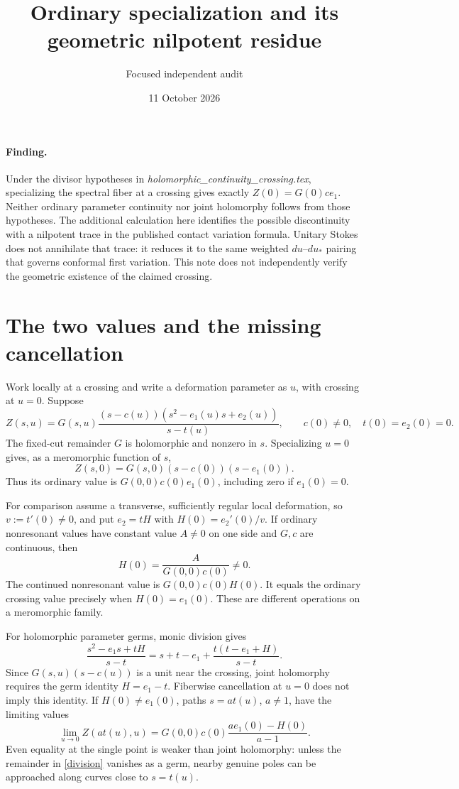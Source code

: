 \documentclass[11pt]{article}
\title{Ordinary specialization and its geometric nilpotent residue}
\author{Focused independent audit}
\date{11 October 2026}
\begin{document}
\maketitle

\paragraph{Finding.}
Under the divisor hypotheses in
\emph{holomorphic\_continuity\_crossing.tex}, specializing the spectral
fiber at a crossing gives exactly $Z(0)=G(0)c e_1$. Neither ordinary
parameter continuity nor joint holomorphy follows from those hypotheses.
The additional calculation here identifies the possible discontinuity
with a nilpotent trace in the published contact variation formula.
Unitary Stokes does not annihilate that trace: it reduces it to the
same weighted $du$--$du_*$ pairing that governs conformal first variation.
This note does not independently verify the geometric existence of the
claimed crossing.

\section{The two values and the missing cancellation}
Work locally at a crossing and write a deformation parameter as $u$,
with crossing at $u=0$. Suppose
\[
 Z(s,u)=G(s,u)\frac{(s-c(u))(s^2-e_1(u)s+e_2(u))}{s-t(u)},
 \qquad c(0)\ne0,\quad t(0)=e_2(0)=0.
\]
The fixed-cut remainder $G$ is holomorphic and nonzero in $s$.
Specializing $u=0$ gives, as a meromorphic function of $s$,
\[
 Z(s,0)=G(s,0)(s-c(0))(s-e_1(0)).
\]
Thus its ordinary value is $G(0,0)c(0)e_1(0)$, including zero if
$e_1(0)=0$.

For comparison assume a transverse, sufficiently regular local
deformation, so $v:=t'(0)\ne0$, and put $e_2=tH$ with
$H(0)=e_2'(0)/v$. If ordinary nonresonant values have constant value
$A\ne0$ on one side and $G,c$ are continuous, then
\[
 H(0)=\frac{A}{G(0,0)c(0)}\ne0.
\]
The continued nonresonant value is $G(0,0)c(0)H(0)$.
It equals the ordinary crossing value precisely when $H(0)=e_1(0)$.
These are different operations on a meromorphic family.

For holomorphic parameter germs, monic division gives
\begin{equation}\label{division}
 \frac{s^2-e_1s+tH}{s-t}
 =s+t-e_1+\frac{t(t-e_1+H)}{s-t}.
\end{equation}
Since $G(s,u)(s-c(u))$ is a unit near the crossing, joint holomorphy
requires the germ identity $H=e_1-t$. Fiberwise cancellation at $u=0$
does not imply this identity. If $H(0)\ne e_1(0)$, paths $s=a t(u)$,
$a\ne1$, have the limiting values
\[
 \lim_{u\to0}Z(a t(u),u)
 =G(0,0)c(0)\frac{a e_1(0)-H(0)}{a-1}.
\]
Even equality at the single point is weaker than joint holomorphy:
unless the remainder in \eqref{division} vanishes as a germ, nearby
genuine poles can be approached along curves close to $s=t(u)$.
\end{document}
